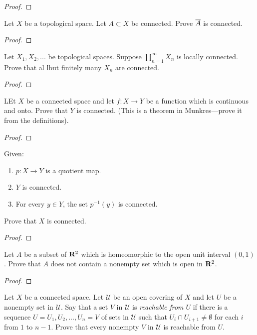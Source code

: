 \begin{proof}
\end{proof}
\begin{problem}
Let $X$ be a topological space. Let $A\subset X$ be
connected. Prove $\overline{A}$ is connected.
\end{problem}
\begin{proof}
\end{proof}
\begin{problem}
Let $X_1,X_2,...$ be topological spaces. Suppose
$\prod_{n=1}^\infty X_n$ is locally connected. Prove that al lbut
finitely many $X_n$ are connected.
\end{problem}
\begin{proof}
\end{proof}
\begin{problem}
LEt $X$ be a connected space and let $f\colon X\to Y$ be a
function which is continuous and onto. Prove that $Y$ is
connected. (This is a theorem in Munkres---prove it from the
definitions).
\end{problem}
\begin{proof}
\end{proof}
\begin{problem}
Given:
\begin{enumerate}[noitemsep,label=(\roman*)]
\item $p\colon X\to Y$ is a quotient map.
\item $Y$ is connected.
\item For every $y\in Y$, the set $p^{-1}(y)$ is connected.
\end{enumerate}
Prove that $X$ is connected.
\end{problem}
\begin{proof}
\end{proof}
\begin{problem}
Let $A$ be a subset of $\mathbf{R}^2$ which is homeomorphic to the open
unit interval $(0,1)$. Prove that $A$ does not contain a nonempty
set which is open in $\mathbf{R}^2$.
\end{problem}
\begin{proof}
\end{proof}
\begin{problem}
Let $X$ be a connected space. Let $\mathcal{U}$ be an open
covering of $X$ and let $U$ be a nonempty set in
$\mathcal{U}$. Say that a set $V$ in $\mathcal{U}$ is
\emph{reachable from $U$} if there is a sequence
$U=U_1,U_2,...,U_n=V$ of sets in $\mathcal{U}$ such that $U_i\cap
U_{i+1}\neq\emptyset$ for each $i$ from $1$ to $n-1$. Prove that
every nonempty $V$ in $\mathcal{U}$ is reachable from $U$.
\end{problem}
